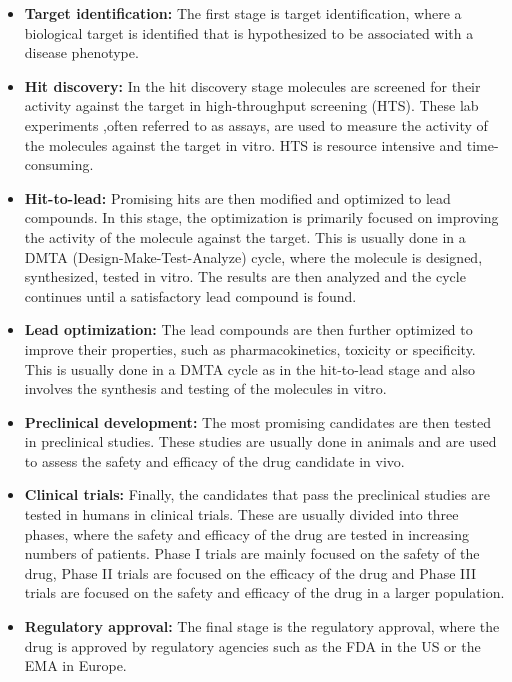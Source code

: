 \begin{itemize}
    \item \textbf{Target identification:} The first stage is target identification, 
    where a biological target is identified that is hypothesized to be associated
    with a disease phenotype.
    \item \textbf{Hit discovery:} In the hit discovery stage molecules are
    screened for their activity against the target in high-throughput screening (HTS).
    These lab experiments ,often referred to as assays, are used to measure the
    activity of the molecules against the target in vitro. HTS is resource
    intensive and time-consuming.
    \item \textbf{Hit-to-lead:} Promising hits are then modified and optimized
    to lead compounds. In this stage, the optimization is primarily focused on
    improving the activity of the molecule against the target. This is usually 
    done in a DMTA (Design-Make-Test-Analyze) cycle, where the molecule is
    designed, synthesized, tested in vitro. The results are then analyzed and the cycle 
    continues until a satisfactory lead compound is found.
    \item \textbf{Lead optimization:} The lead compounds are then further
    optimized to improve their properties, such as pharmacokinetics, toxicity or
    specificity. This is usually done in a DMTA cycle as in the
    hit-to-lead stage and also involves the synthesis and testing of the
    molecules in vitro.
    \item \textbf{Preclinical development:} The most promising candidates are then tested in
    preclinical studies. These studies are usually done in animals and are used
    to assess the safety and efficacy of the drug candidate in vivo. 
    \item \textbf{Clinical trials:} Finally, the candidates that pass the
    preclinical studies are tested in humans in clinical trials. 
    These are usually divided into three phases, where the safety and efficacy
    of the drug are tested in increasing numbers of patients. 
    Phase I trials are mainly focused on the safety of the drug, Phase II trials
    are focused on the efficacy of the drug and Phase III trials are focused on
    the safety and efficacy of the drug in a larger population.
    \item \textbf{Regulatory approval:} The final stage is the regulatory
    approval, where the drug is approved by regulatory agencies such as the FDA
    in the US or the EMA in Europe. 
\end{itemize}

